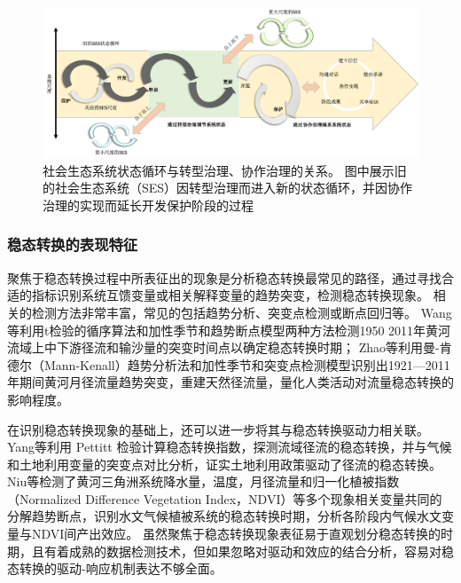 \begin{figure}[!ht] %
    \includegraphics[width=\textwidth]{img/ch1/ch1_governance_driver.png}
    \caption[社会\textendash{}生态系统状态循环]{社会\textendash{}生态系统状态循环与转型治理、协作治理的关系。
    图中展示旧的社会\textendash{}生态系统（SES）因转型治理而进入新的状态循环，并因协作治理的实现而延长开发保护阶段的过程}\label{ch1:fig:governance_driver}
\end{figure}

\subsubsection{稳态转换的表现特征}

聚焦于稳态转换过程中所表征出的现象是分析稳态转换最常见的路径，通过寻找合适的指标识别系统互馈变量或相关解释变量的趋势突变，检测稳态转换现象。
相关的检测方法非常丰富，常见的包括趋势分析、突变点检测或断点回归等。
Wang等利用t检验的循序算法和加性季节和趋势断点模型两种方法检测1950 \textendash{} 2011年黄河流域上中下游径流和输沙量的突变时间点以确定稳态转换时期\cite{wang2014}；
Zhao等利用曼-肯德尔（Mann-Kenall）趋势分析法和加性季节和突变点检测模型识别出1921—2011年期间黄河月径流量趋势突变，重建天然径流量，量化人类活动对流量稳态转换的影响程度\cite{zhao2015}。

在识别稳态转换现象的基础上，还可以进一步将其与稳态转换驱动力相关联。
Yang等利用 Pettitt 检验计算稳态转换指数，探测流域径流的稳态转换，并与气候和土地利用变量的突变点对比分析，证实土地利用政策驱动了径流的稳态转换\cite{yang2012a}。
Niu等检测了黄河三角洲系统降水量，温度，月径流量和归一化植被指数（Normalized Difference Vegetation Index，NDVI）等多个现象相关变量共同的分解趋势断点，识别水文\textendash{}气候\textendash{}植被系统的稳态转换时期，分析各阶段内气候水文变量与NDVI间产出效应\cite{niu2020}。
虽然聚焦于稳态转换现象表征易于直观划分稳态转换的时期，且有着成熟的数据检测技术，但如果忽略对驱动和效应的结合分析，容易对稳态转换的驱动-响应机制表达不够全面。

